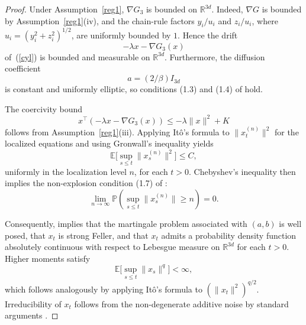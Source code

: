 \documentclass[11pt, twoside]{report}
\begin{document}
\begin{proof}
Under Assumption~\ref{reg1}, $\nabla G_3$ is bounded on $\mathbb R^{3d}$.
Indeed, $\nabla G$ is bounded by Assumption~\ref{reg1}(iv), and the
chain-rule factors $y_i/u_i$ and $z_i/u_i$, where
$u_i=(y_i^2+z_i^2)^{1/2}$, are uniformly bounded by $1$. Hence the drift
\[
-\lambda x-\nabla G_3(x)
\]
of~(\ref{cyl}) is bounded and measurable on $\mathbb R^{3d}$.
Furthermore, the diffusion coefficient
\[
a=(2/\beta)I_{3d}
\]
is constant and uniformly elliptic, so conditions (1.3) and (1.4) of
\cite{Stroock2013-df} hold.

The coercivity bound
\[
x^\top(-\lambda x-\nabla G_3(x))
\leq
-\lambda\|x\|^2+K
\]
follows from Assumption~\ref{reg1}(iii). Applying It\^o's formula to
$\|x_t^{(n)}\|^2$ for the localized equations and using Gronwall's
inequality yields
\[
\mathbb E\Big[\sup_{s\leq t}\|x_s^{(n)}\|^2\Big]
\leq C,
\]
uniformly in the localization level $n$, for each $t>0$. Chebyshev's
inequality then implies the non-explosion condition (1.7) of
\cite[Theorem 10.1.3]{Stroock2013-df}:
\[
\lim_{n\to\infty}
\mathbb P\!\left(
\sup_{s\leq t}\|x_s^{(n)}\|\geq n
\right)
=0.
\]

Consequently, \cite[Corollary 10.1.4]{Stroock2013-df} implies that the
martingale problem associated with $(a,b)$ is well posed, that $x_t$ is
strong Feller, and that $x_t$ admits a probability density function
absolutely continuous with respect to Lebesgue measure on
$\mathbb R^{3d}$ for each $t>0$. Higher moments satisfy
\[
\mathbb E\Big[\sup_{s\leq t}\|x_s\|^q\Big]
<\infty,
\]
which follows analogously by applying It\^o's formula to
$(\|x_t\|^2)^{q/2}$. Irreducibility of $x_t$ follows from the
non-degenerate additive noise by standard arguments
\cite[Section~6]{Bellet2006-pq}.

\end{proof}
\end{document}
